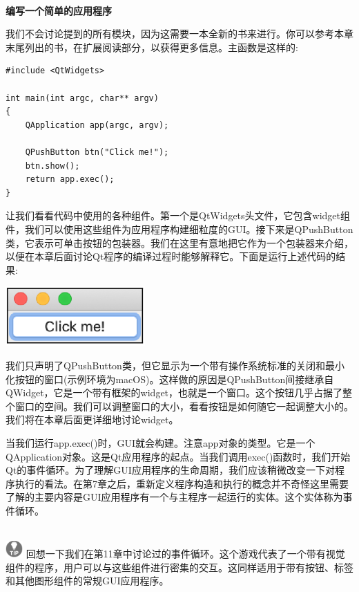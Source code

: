 \noindent\textbf{}\ \par
\textbf{编写一个简单的应用程序} \ \par
我们不会讨论提到的所有模块，因为这需要一本全新的书来进行。你可以参考本章末尾列出的书，在扩展阅读部分，以获得更多信息。主函数是这样的: \par

\begin{lstlisting}[caption={}]
#include <QtWidgets>

int main(int argc, char** argv)
{
	QApplication app(argc, argv);
	
	QPushButton btn("Click me!");
	btn.show();
	return app.exec();
}
\end{lstlisting}

让我们看看代码中使用的各种组件。第一个是QtWidgets头文件，它包含widget组件，我们可以使用这些组件为应用程序构建细粒度的GUI。接下来是QPushButton类，它表示可单击按钮的包装器。我们在这里有意地把它作为一个包装器来介绍，以便在本章后面讨论Qt程序的编译过程时能够解释它。下面是运行上述代码的结果: \par

\begin{center}
	\includegraphics[width=0.4\textwidth]{content/Section-2/Chapter-14/5}
\end{center}

我们只声明了QPushButton类，但它显示为一个带有操作系统标准的关闭和最小化按钮的窗口(示例环境为macOS)。这样做的原因是QPushButton间接继承自QWidget，它是一个带有框架的widget，也就是一个窗口。这个按钮几乎占据了整个窗口的空间。我们可以调整窗口的大小，看看按钮是如何随它一起调整大小的。我们将在本章后面更详细地讨论widget。 \par
当我们运行app.exec()时，GUI就会构建。注意app对象的类型。它是一个QApplication对象。这是Qt应用程序的起点。当我们调用exec()函数时，我们开始Qt的事件循环。为了理解GUI应用程序的生命周期，我们应该稍微改变一下对程序执行的看法。在第7章之后，重新定义程序构造和执行的概念并不奇怪这里需要了解的主要内容是GUI应用程序有一个与主程序一起运行的实体。这个实体称为事件循环。 \par

\hspace*{\fill} \\ %
\includegraphics[width=0.05\textwidth]{images/tip}
回想一下我们在第11章中讨论过的事件循环。这个游戏代表了一个带有视觉组件的程序，用户可以与这些组件进行密集的交互。这同样适用于带有按钮、标签和其他图形组件的常规GUI应用程序。 \par
\noindent\textbf{}\ \par

